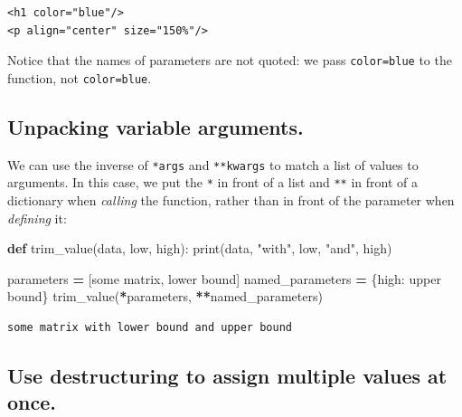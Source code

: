 \documentclass[
]{krantz}
\makeatletter
\newenvironment{Shaded}{\begin{snugshade}}{\end{snugshade}}
\newcommand{\BuiltInTok}[1]{#1}
\newcommand{\KeywordTok}[1]{\textcolor[rgb]{0.13,0.29,0.53}{\textbf{#1}}}
\newcommand{\NormalTok}[1]{#1}
\newcommand{\OperatorTok}[1]{\textcolor[rgb]{0.81,0.36,0.00}{\textbf{#1}}}
\newcommand{\StringTok}[1]{\textcolor[rgb]{0.31,0.60,0.02}{#1}}
\newenvironment{kframe}{%
\medskip{}
\setlength{\fboxsep}{.8em}
 \def\at@end@of@kframe{}%
 \ifinner\ifhmode%
  \def\at@end@of@kframe{\end{minipage}}%
  \begin{minipage}{\columnwidth}%
 \fi\fi%
 \def\FrameCommand##1{\hskip\@totalleftmargin \hskip-\fboxsep
 \colorbox{shadecolor}{##1}\hskip-\fboxsep
     \hskip-\linewidth \hskip-\@totalleftmargin \hskip\columnwidth}%
 \MakeFramed {\advance\hsize-\width
   \@totalleftmargin\z@ \linewidth\hsize
   \@setminipage}}%
 {\par\unskip\endMakeFramed%
 \at@end@of@kframe}
\renewenvironment{Shaded}{\begin{kframe}}{\end{kframe}}
\makeatother
\begin{document}
\begin{verbatim}
<h1 color="blue"/>
<p align="center" size="150%"/>
\end{verbatim}

Notice that the names of parameters are not quoted:
we pass \texttt{color=\textquotesingle{}blue\textquotesingle{}} to the function,
not \texttt{\textquotesingle{}color\textquotesingle{}=\textquotesingle{}blue\textquotesingle{}}.

\hypertarget{unpacking-variable-arguments.}{%
\subsection{Unpacking variable arguments.}\label{unpacking-variable-arguments.}}

We can use the inverse of \texttt{*args} and \texttt{**kwargs} to match a list of values to arguments.
In this case,
we put the \texttt{*} in front of a list and \texttt{**} in front of a dictionary when \emph{calling} the function,
rather than in front of the parameter when \emph{defining} it:

\begin{Shaded}
\begin{Highlighting}[]
\KeywordTok{def}\NormalTok{ trim\_value(data, low, high):}
    \BuiltInTok{print}\NormalTok{(data, }\StringTok{"with"}\NormalTok{, low, }\StringTok{"and"}\NormalTok{, high)}

\NormalTok{parameters }\OperatorTok{=}\NormalTok{ [}\StringTok{\textquotesingle{}some matrix\textquotesingle{}}\NormalTok{, }\StringTok{\textquotesingle{}lower bound\textquotesingle{}}\NormalTok{]}
\NormalTok{named\_parameters }\OperatorTok{=}\NormalTok{ \{}\StringTok{\textquotesingle{}high\textquotesingle{}}\NormalTok{: }\StringTok{\textquotesingle{}upper bound\textquotesingle{}}\NormalTok{\}}
\NormalTok{trim\_value(}\OperatorTok{*}\NormalTok{parameters, }\OperatorTok{**}\NormalTok{named\_parameters)}
\end{Highlighting}
\end{Shaded}

\begin{verbatim}
some matrix with lower bound and upper bound
\end{verbatim}

\hypertarget{use-destructuring-to-assign-multiple-values-at-once.}{%
\subsection{Use destructuring to assign multiple values at once.}\label{use-destructuring-to-assign-multiple-values-at-once.}}
\end{document}
